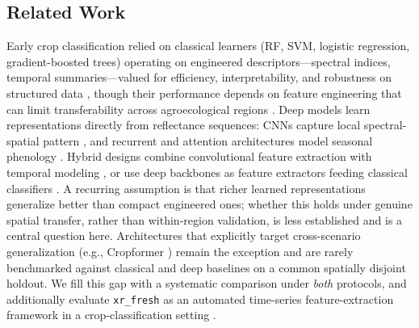 \documentclass[journal]{IEEEtran}
\begin{document}
\subsection{Related Work}
Early crop classification relied on classical learners (RF, SVM, logistic regression, gradient-boosted trees) operating on engineered descriptors---spectral indices, temporal summaries---valued for efficiency, interpretability, and robustness on structured data \cite{maxwell2019, belgiu2016, breiman2001, chen2016, ke2017}, though their performance depends on feature engineering that can limit transferability across agroecological regions \cite{wardlow2007towards, mahlayeye2024}. Deep models learn representations directly from reflectance sequences: CNNs capture local spectral-spatial pattern \cite{cnn_multitemp}, and recurrent and attention architectures model seasonal phenology \cite{ieee2017, russwurm2018, ltae2020, russwurm2020}. Hybrid designs combine convolutional feature extraction with temporal modeling \cite{fan2023hcrnn, tufail2025cnnrnn, bandar2024bilstm}, or use deep backbones as feature extractors feeding classical classifiers \cite{espejo2020, koklu2022, yang2020}. A recurring assumption is that richer learned representations generalize better than compact engineered ones; whether this holds under genuine spatial transfer, rather than within-region validation, is less established and is a central question here. Architectures that explicitly target cross-scenario generalization (e.g., Cropformer \cite{cropformer2023}) remain the exception and are rarely benchmarked against classical and deep baselines on a common spatially disjoint holdout. We fill this gap with a systematic comparison under \emph{both} protocols, and additionally evaluate \texttt{xr\_fresh} as an automated time-series feature-extraction framework in a crop-classification setting \cite{mann2025}.
\end{document}
